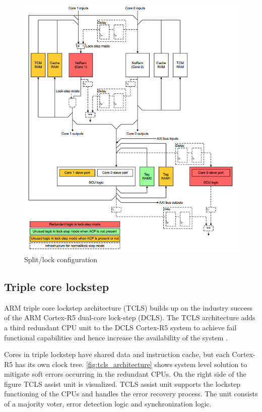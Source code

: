 \begin{figure}[H]

      \centering
      \includegraphics[width=1\linewidth]{images/split_lock_configuration.png}
      \caption{Split/lock configuration \citep{cortex_r8_reference_manual}}
      \label{fig:tcls_architecture}
    
\end{figure}

\subsection{Triple core lockstep}

ARM triple core lockstep architecture (TCLS) builds up on the industry success of the ARM Cortex-R5 dual-core lock-step (DCLS). The TCLS architecture adds a third redundant CPU unit to the DCLS Cortex-R5 system to achieve fail functional capabilities and hence increase the availability of the system \citep{TCLS_cortex_r}.

Cores in triple lockstep have shared data and instruction cache, but each Cortex-R5 has its own clock tree. \autoref{fig:tcls_architecture} shows system level solution to mitigate soft errors occurring in the redundant CPUs. On the right side of the figure TCLS assist unit is visualized. TCLS assist unit supports the lockstep functioning of the CPUs and handles the error recovery process. The unit consists of a majority voter, error detection logic and synchronization logic.


